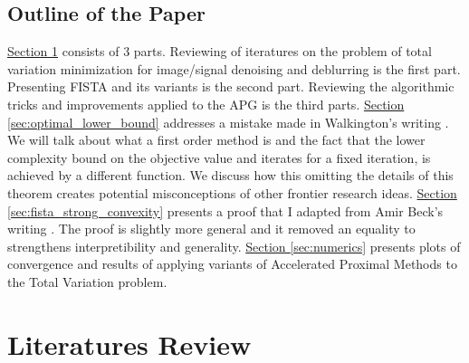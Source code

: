 \documentclass[]{article}
\theoremstyle{definition}
\numberwithin{equation}{subsection}
\begin{document}
    \subsection{Outline of the Paper}
        \hyperref[sec:Literatures]{Section \ref*{sec:Literatures}} consists of 3 parts. 
        Reviewing of iteratures on the problem of total variation minimization for image/signal denoising and deblurring is the first part. 
        Presenting FISTA and its variants is the second part. 
        Reviewing the algorithmic tricks and improvements applied to the APG is the third parts. 
        \hyperref[sec:optimal_lower_bound]{Section \ref*{sec:optimal_lower_bound}} addresses a mistake made in Walkington's writing \cite[theorem 2.4]{noel_nesterovs_nodate}. 
        We will talk about what a first order method is and the fact that the lower complexity bound on the objective value and iterates for a fixed iteration, is achieved by a different function. 
        We discuss how this omitting the details of this theorem creates potential misconceptions of other frontier research ideas. 
        \hyperref[sec:fista_strong_convexity]{Section \ref*{sec:fista_strong_convexity}} presents a proof that I adapted from Amir Beck's writing \cite[theorem 10.7.7]{beck_first-order_nodate}. 
        The proof is slightly more general and it removed an equality to strengthens interpretibility and generality. 
        \hyperref[sec:numerics]{Section \ref*{sec:numerics}} presents plots of convergence and results of applying variants of Accelerated Proximal Methods to the Total Variation problem. 
        

        
        


\section{Literatures Review}\label{sec:Literatures}
\end{document}
